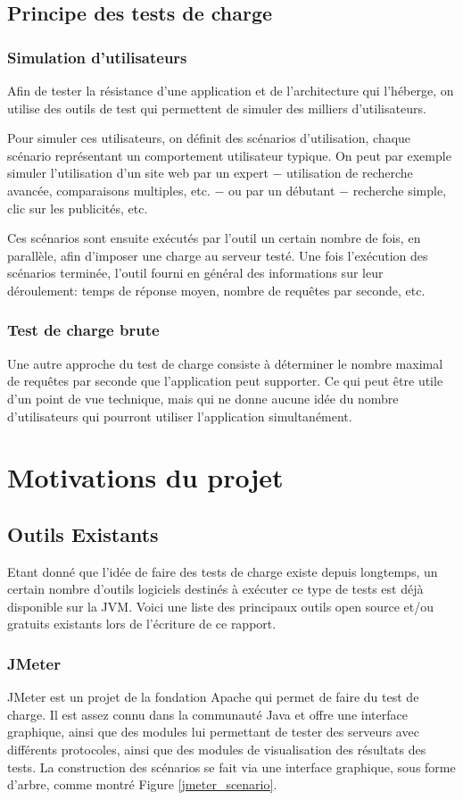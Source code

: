 \subsection{Principe des tests de charge}
\subsubsection{Simulation d'utilisateurs}
Afin de tester la résistance d'une application et de l'architecture qui l'héberge, on utilise des outils de test qui permettent de simuler des milliers d'utilisateurs.

Pour simuler ces utilisateurs, on définit des scénarios d'utilisation, chaque scénario représentant un comportement utilisateur typique. On peut par exemple simuler l'utilisation d'un site web par un expert $-$ utilisation de recherche avancée, comparaisons multiples, etc. $-$ ou par un débutant $-$ recherche simple, clic sur les publicités, etc.

Ces scénarios sont ensuite exécutés par l'outil un certain nombre de fois, en parallèle, afin d'imposer une charge au serveur testé. Une fois l'exécution des scénarios terminée, l'outil fourni en général des informations sur leur déroulement: temps de réponse moyen, nombre de requêtes par seconde, etc.

\subsubsection{Test de charge brute}
Une autre approche du test de charge consiste à déterminer le nombre maximal de requêtes par seconde que l'application peut supporter. Ce qui peut être utile d'un point de vue technique, mais qui ne donne aucune idée du nombre d'utilisateurs qui pourront utiliser l'application simultanément.

\section{Motivations du projet}
\subsection{Outils Existants}
Etant donné que l'idée de faire des tests de charge existe depuis longtemps, un certain nombre d'outils logiciels destinés à exécuter ce type de tests est déjà disponible sur la JVM. Voici une liste des principaux outils open source et/ou gratuits existants lors de l'écriture de ce rapport.

\subsubsection{JMeter} 
JMeter\cite{www_jmeter} est un projet de la fondation Apache qui permet de faire du test de charge. Il est assez connu dans la communauté Java et offre une interface graphique, ainsi que des modules lui permettant de tester des serveurs avec différents protocoles, ainsi que des modules de visualisation des résultats des tests. La construction des scénarios se fait via une interface graphique, sous forme d'arbre, comme montré Figure \ref{jmeter_scenario}.

